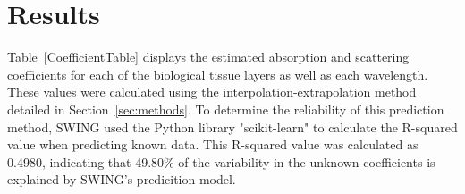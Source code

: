 \documentclass[journal,twoside,web]{ieeecolor}
\begin{document}
\section{Results}
\label{sec:results}

Table~\ref{CoefficientTable} displays the estimated absorption and scattering coefficients for each of the biological tissue layers as well as each wavelength.
These values were calculated using the interpolation-extrapolation method detailed in Section~\ref{sec:methods}. To determine the reliability of this prediction method, SWING used
the Python library "scikit-learn" to calculate the R-squared value when predicting known data. This R-squared value was calculated as 0.4980, indicating that 49.80\% of the 
variability in the unknown coefficients is explained by SWING's predicition model.

\begin{table}[h]
\centering
\caption{Estimated Optical Coefficients}
\label{CoefficientTable}
\setlength{\tabcolsep}{3pt}
\renewcommand{\arraystretch}{1.5}
\label{tab1}
\end{table}
\end{document}
